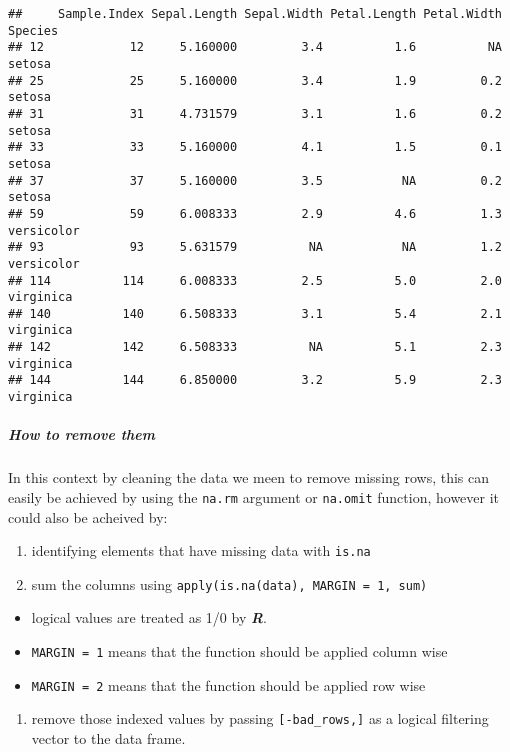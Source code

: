 \documentclass[
]{article}
\providecommand{\tightlist}{%
  \setlength{\itemsep}{0pt}\setlength{\parskip}{0pt}}
\begin{document}
\begin{verbatim}
##     Sample.Index Sepal.Length Sepal.Width Petal.Length Petal.Width    Species
## 12            12     5.160000         3.4          1.6          NA     setosa
## 25            25     5.160000         3.4          1.9         0.2     setosa
## 31            31     4.731579         3.1          1.6         0.2     setosa
## 33            33     5.160000         4.1          1.5         0.1     setosa
## 37            37     5.160000         3.5           NA         0.2     setosa
## 59            59     6.008333         2.9          4.6         1.3 versicolor
## 93            93     5.631579          NA           NA         1.2 versicolor
## 114          114     6.008333         2.5          5.0         2.0  virginica
## 140          140     6.508333         3.1          5.4         2.1  virginica
## 142          142     6.508333          NA          5.1         2.3  virginica
## 144          144     6.850000         3.2          5.9         2.3  virginica
\end{verbatim}

\hypertarget{how-to-remove-them}{%
\subparagraph{How to remove them}\label{how-to-remove-them}}

In this context by cleaning the data we meen to remove missing rows,
this can easily be achieved by using the \texttt{na.rm} argument or
\texttt{na.omit} function, however it could also be acheived by:

\begin{enumerate}
\def\labelenumi{\arabic{enumi}.}
\tightlist
\item
  identifying elements that have missing data with \texttt{is.na}
\item
  sum the columns using \texttt{apply(is.na(data),\ MARGIN\ =\ 1,\ sum)}
\end{enumerate}

\begin{itemize}
\tightlist
\item
  logical values are treated as 1/0 by \textbf{\emph{R}}.
\item
  \texttt{MARGIN\ =\ 1} means that the function should be applied column
  wise
\item
  \texttt{MARGIN\ =\ 2} means that the function should be applied row
  wise
\end{itemize}

\begin{enumerate}
\def\labelenumi{\arabic{enumi}.}
\setcounter{enumi}{2}
\tightlist
\item
  remove those indexed values by passing \texttt{{[}-bad\_rows,{]}} as a
  logical filtering vector to the data frame.
\end{enumerate}
\end{document}
